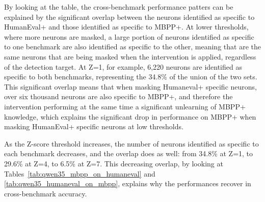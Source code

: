 \documentclass[mscthesis]{usiinfthesis}
\begin{document}
\begin{table}[h]
\centering
\caption{Overlap between HumanEval+ and MBPP+ neuron sets at each Z-score threshold.}
\label{tab:neuron_overlap}
\end{table}
By looking at the table, the cross-benchmark performance patters can be explained by the significant overlap between the neurons identified as specific to HumanEval+ and those identified as specific to MBPP+.
At lower thresholds, where more neurons are masked, a large portion of neurons identified
as specific to one benchmark are also identified as specific to the other, meaning that
are the same neurons that are being masked when the intervention is applied, regardless of the detection target.
At Z=1, for example, 6,220 neurons are identified as specific to both benchmarks, 
representing the 34.8\% of the union of the two sets.
This significant overlap means that when masking Humaneval+ specific neurons, 
over six thousand neurons are also specific to MBPP+, and therefore the intervention 
performing at the same time a significant unlearning of MBPP+ knowledge, which explains the significant drop in performance on MBPP+ when masking HumanEval+ specific neurons at low thresholds.
\par\vspace{1em}
As the Z-score threshold increases, the number of neurons identified as specific to each
benchmark decreases, and the overlap does as well: from 34.8\% at Z=1, to 29.6\% at Z=4, to 6.5\% at Z=7.
This decreasing overlap, by looking at Tables~\ref{tab:qwen35_mbpp_on_humaneval} and \ref{tab:qwen35_humaneval_on_mbpp}, explains why the performances recover in cross-benchmark accuracy.
\end{document}
